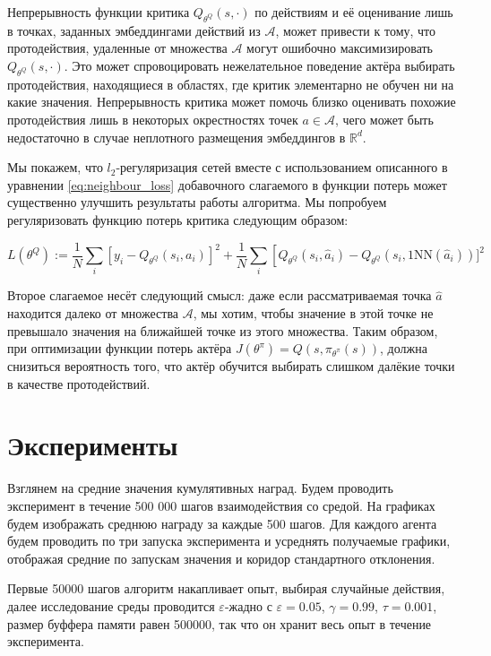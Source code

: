\documentclass[a4paper, 12pt]{article}
\begin{document}
Непрерывность функции критика $Q_{\theta^Q}(s, \cdot)$ по действиям и её оценивание лишь в точках, заданных эмбеддингами действий из $\mathcal{A}$, может привести к тому, что протодействия, удаленные от множества $\mathcal{A}$ могут ошибочно максимизировать $Q_{\theta^Q}(s, \cdot)$. Это может спровоцировать нежелательное поведение актёра выбирать протодействия, находящиеся в областях, где критик элементарно не обучен ни на какие значения. Непрерывность критика может помочь близко оценивать похожие протодействия лишь в некоторых окрестностях точек $a \in \mathcal{A}$, чего может быть недостаточно в случае неплотного размещения эмбеддингов в $\mathbb{R}^d$.

Мы покажем, что $l_2$-регуляризация сетей вместе с использованием описанного в уравнении \ref{eq:neighbour_loss} добавочного слагаемого в функции потерь может существенно улучшить результаты работы алгоритма. 
Мы попробуем регуляризовать функцию потерь критика следующим образом:

\begin{equation}
\label{eq:neighbour_loss}
L\left(\theta^{Q}\right):=\frac{1}{N} \sum_{i}\left[y_{i}-Q_{\theta^{Q}}\left(s_{i}, a_{i}\right)\right]^{2} + 
\frac{1}{N} \sum_{i}\left[Q_{\theta^{Q}}\left(s_{i}, \hat{a}_{i}\right) - Q_{\theta^{Q}}\left(s_{i}, \textrm{1NN} \left(\hat{a}_{i} \right)\right)]^{2} \right.
\end{equation}

Второе слагаемое несёт следующий смысл: даже если рассматриваемая точка $\hat{a}$ находится далеко от множества $\mathcal{A}$, мы хотим, чтобы значение в этой точке не превышало значения на ближайшей точке из этого множества. Таким образом, при оптимизации функции потерь актёра $J(\theta^\pi) = Q(s, \pi_{\theta^\pi}(s))$, должна снизиться вероятность того, что актёр обучится выбирать слишком далёкие точки в качестве протодействий. 

\section{Эксперименты}

Взглянем на средние значения кумулятивных наград. Будем проводить эксперимент в течение 500 000 шагов взаимодействия со средой. На графиках будем изображать среднюю награду за каждые 500 шагов. Для каждого агента будем проводить по три запуска эксперимента и усреднять получаемые графики, отображая средние по запускам значения и коридор стандартного отклонения.

Первые 50000 шагов алгоритм накапливает опыт, выбирая случайные действия, далее исследование среды проводится $\varepsilon$-жадно с $\varepsilon=0.05$, $\gamma = 0.99$, $\tau=0.001$, размер буффера памяти равен 500000, так что он хранит весь опыт в течение эксперимента.
\end{document}
